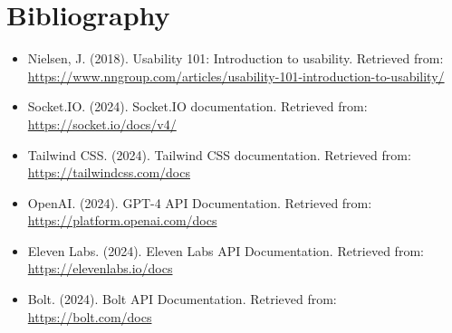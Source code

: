 \chapter*{Bibliography}

\begin{itemize}
  \item Nielsen, J. (2018). Usability 101: Introduction to usability. 
        \newline Retrieved from: \url{https://www.nngroup.com/articles/usability-101-introduction-to-usability/}
  \item Socket.IO. (2024). Socket.IO documentation. 
        \newline Retrieved from: \url{https://socket.io/docs/v4/}
  \item Tailwind CSS. (2024). Tailwind CSS documentation. 
        \newline Retrieved from: \url{https://tailwindcss.com/docs}
  \item OpenAI. (2024). GPT-4 API Documentation. 
        \newline Retrieved from: \url{https://platform.openai.com/docs}

  \item Eleven Labs. (2024). Eleven Labs API Documentation. 
        \newline Retrieved from: \url{https://elevenlabs.io/docs}

  \item Bolt. (2024). Bolt API Documentation. 
        \newline Retrieved from: \url{https://bolt.com/docs}
\end{itemize}
